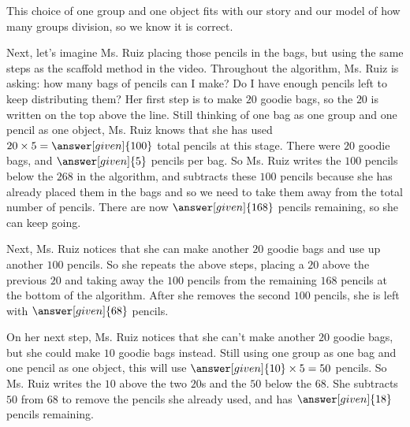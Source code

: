 \documentclass{ximera}
\begin{document}
\begin{example}
\begin{image}
\end{image}
This choice of one group and one object fits with our story and our model of how many groups division, so we know it is correct.

Next, let's imagine Ms. Ruiz placing those pencils in the bags, but using the same steps as the scaffold method in the video. Throughout the algorithm, Ms. Ruiz is asking: how many bags of pencils can I make? Do I have enough pencils left to keep distributing them? Her first step is to make $20$ goodie bags, so the $20$ is written on the top above the line. Still thinking of one bag as one group and one pencil as one object, Ms. Ruiz knows that she has used $20 \times 5 = \answer[given]{100}$ total pencils at this stage. There were $20$ goodie bags, and $\answer[given]{5}$ pencils per bag. So Ms. Ruiz writes the $100$ pencils below the $268$ in the algorithm, and subtracts these $100$ pencils because she has already placed them in the bags and so we need to take them away from the total number of pencils. There are now $\answer[given]{168}$ pencils remaining, so she can keep going.

Next, Ms. Ruiz notices that she can make another $20$ goodie bags and use up another $100$ pencils. So she repeats the above steps, placing a $20$ above the previous $20$ and taking away the $100$  pencils from the remaining $168$ pencils at the bottom of the algorithm. After she removes the second $100$ pencils, she is left with $\answer[given]{68}$ pencils.

On her next step, Ms. Ruiz notices that she can't make another $20$ goodie bags, but she could make $10$ goodie bags instead. Still using one group as one bag and one pencil as one object, this will use $\answer[given]{10} \times 5 = 50$ pencils. So Ms. Ruiz writes the $10$ above the two $20$s and the $50$ below the $68$. She subtracts $50$ from $68$ to remove the pencils she already used, and has $\answer[given]{18}$ pencils remaining.


\end{example}
\end{document}
